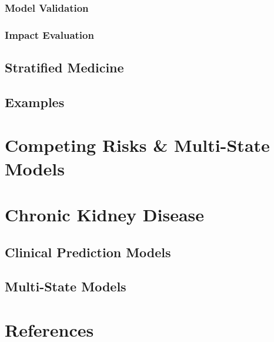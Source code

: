 \documentclass[
]{article}
\begin{document}
\hypertarget{model-validation}{%
\subsubsection{Model Validation}\label{model-validation}}

\hypertarget{impact-evaluation}{%
\subsubsection{Impact Evaluation}\label{impact-evaluation}}

\hypertarget{stratified-medicine}{%
\subsection{Stratified Medicine}\label{stratified-medicine}}

\hypertarget{examples}{%
\subsection{Examples}\label{examples}}

\hypertarget{competing-risks-multi-state-models}{%
\section{Competing Risks \& Multi-State Models}\label{competing-risks-multi-state-models}}

\hypertarget{chronic-kidney-disease}{%
\section{Chronic Kidney Disease}\label{chronic-kidney-disease}}

\hypertarget{clinical-prediction-models-1}{%
\subsection{Clinical Prediction Models}\label{clinical-prediction-models-1}}

\hypertarget{multi-state-models}{%
\subsection{Multi-State Models}\label{multi-state-models}}

\hypertarget{references}{%
\section*{References}\label{references}}
\end{document}
